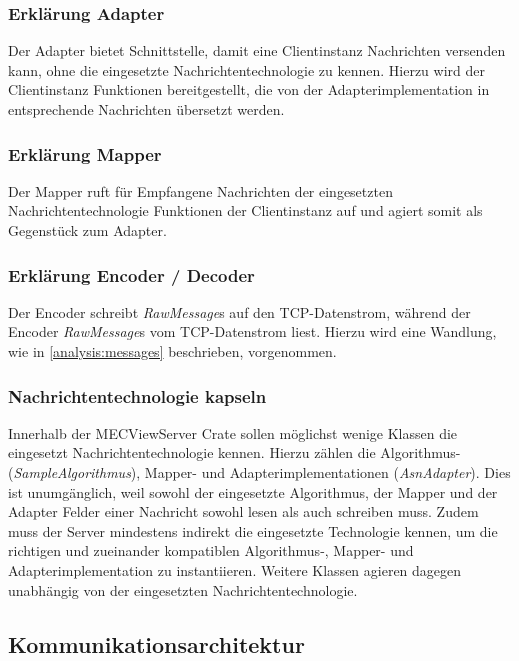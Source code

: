 \subsubsection{Erklärung Adapter}

Der Adapter bietet  Schnittstelle, damit eine Clientinstanz Nachrichten versenden kann, ohne die eingesetzte Nachrichtentechnologie zu kennen.
Hierzu wird der Clientinstanz Funktionen bereitgestellt, die von der Adapterimplementation in entsprechende Nachrichten übersetzt werden.

\subsubsection{Erklärung Mapper}

Der Mapper ruft für Empfangene Nachrichten der eingesetzten Nachrichtentechnologie Funktionen der Clientinstanz auf und agiert somit als Gegenstück zum Adapter.

\subsubsection{Erklärung Encoder / Decoder}

Der Encoder schreibt \textit{RawMessage}s auf den TCP-Datenstrom, während der Encoder \textit{RawMessage}s vom TCP-Datenstrom liest.
Hierzu wird eine Wandlung, wie in \autoref{analysis:messages} beschrieben, vorgenommen.

\subsubsection{Nachrichtentechnologie kapseln}

Innerhalb der MECViewServer Crate sollen möglichst wenige Klassen die eingesetzt Nachrichtentechnologie kennen.
Hierzu zählen die Algorithmus- (\textit{SampleAlgorithmus}), Mapper- und Adapterimplementationen (\textit{AsnAdapter}).
Dies ist unumgänglich, weil sowohl der eingesetzte Algorithmus, der Mapper und der Adapter Felder einer Nachricht sowohl lesen als auch schreiben muss.
Zudem muss der Server mindestens indirekt die eingesetzte Technologie kennen, um die richtigen und zueinander kompatiblen Algorithmus-, Mapper- und Adapterimplementation zu instantiieren.
Weitere Klassen agieren dagegen unabhängig von der eingesetzten Nachrichtentechnologie.

\subsection{Kommunikationsarchitektur}
\label{design:communication:architecture}

